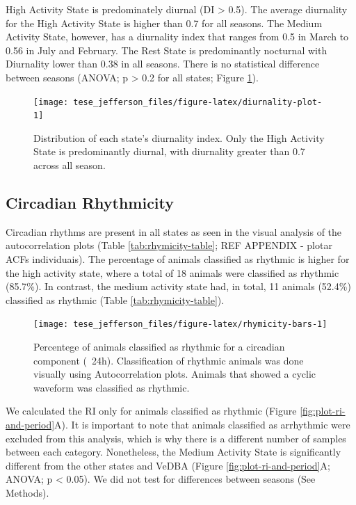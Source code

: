 \documentclass[english,msc,numbers,hidelinks]{coppe}
\begin{document}
  High Activity State is predominately diurnal (DI \textgreater{} 0.5). The average diurnality for the High Activity State is higher than 0.7 for all seasons. The Medium Activity State, however, has a diurnality index that ranges from 0.5 in March to 0.56 in July and February. The Rest State is predominantly nocturnal with Diurnality lower than 0.38 in all seasons. There is no statistical difference between seasons (ANOVA; p \textgreater{} 0.2 for all states; Figure \ref{fig:diurnality-plot}).
  \begin{figure}[H]

  {\centering \texttt{[image: tese\_jefferson\_files/figure-latex/diurnality-plot-1]} 

  }

  \caption{Distribution of each state's diurnality index. Only the High Activity State is predominantly diurnal, with diurnality greater than 0.7 across all season.}\label{fig:diurnality-plot}
  \end{figure}
  \newpage

  \hypertarget{circadian-rhythmicity}{%
  \subsection{Circadian Rhythmicity}\label{circadian-rhythmicity}}

  Circadian rhythms are present in all states as seen in the visual analysis of the autocorrelation plots (Table \ref{tab:rhymicity-table}; REF APPENDIX - plotar ACFs individuais). The percentage of animals classified as rhythmic is higher for the high activity state, where a total of 18 animals were classified as rhythmic (85.7\%). In contrast, the medium activity state had, in total, 11 animals (52.4\%) classified as rhythmic (Table \ref{tab:rhymicity-table}).
  \begin{figure}

  {\centering \texttt{[image: tese\_jefferson\_files/figure-latex/rhymicity-bars-1]} 

  }

  \caption{Percentege of animals classified as rhythmic for a circadian component (~24h). Classification of rhythmic animals was done visually using Autocorrelation plots. Animals that showed a cyclic waveform was classified as rhythmic.}\label{fig:rhymicity-bars}
  \end{figure}
  We calculated the RI only for animals classified as rhythmic (Figure \ref{fig:plot-ri-and-period}A). It is important to note that animals classified as arrhythmic were excluded from this analysis, which is why there is a different number of samples between each category. Nonetheless, the Medium Activity State is significantly different from the other states and VeDBA (Figure \ref{fig:plot-ri-and-period}A; ANOVA; p \textless{} 0.05). We did not test for differences between seasons (See Methods).
\end{document}
